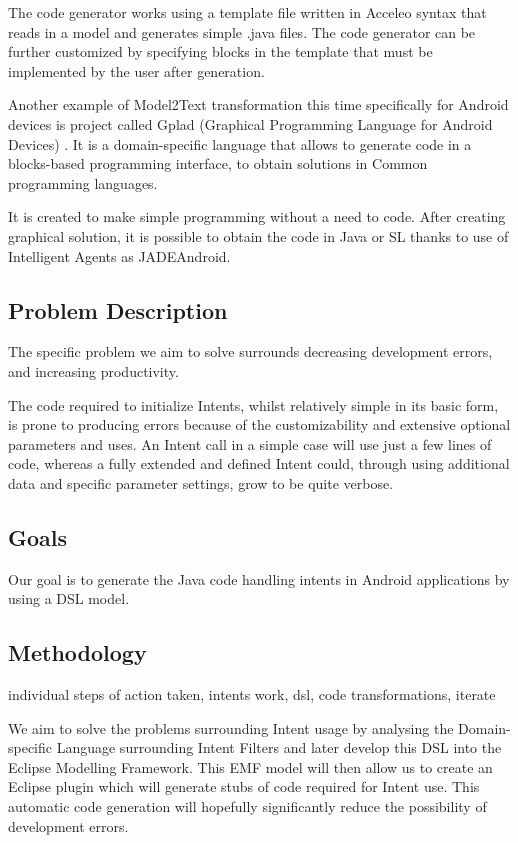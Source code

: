 The code generator works using a template file written in Acceleo syntax that reads in a model and generates simple .java files. The code generator can be further customized by specifying blocks in the template that must be implemented by the user after generation.

Another example of Model2Text transformation this time specifically for Android devices is project called Gplad (Graphical Programming Language for Android Devices) \cite{gplad}. It is a domain-specific language that allows to generate code in a blocks-based programming interface, to obtain solutions in Common programming languages.

It is created to make simple programming without a need to code. After creating graphical solution, it is possible to obtain the code in Java or SL thanks to use of Intelligent Agents as JADEAndroid.

\subsection{Problem Description} 
The specific problem we aim to solve surrounds decreasing development errors, and increasing productivity.

The code required to initialize Intents, whilst relatively simple in its basic form, is prone to producing errors because of the customizability and extensive optional parameters and uses. An Intent call in a simple case will use just a few lines of code, whereas a fully extended and defined Intent could, through using additional data and specific parameter settings, grow to be quite verbose.

\subsection{Goals}
Our goal is to generate the Java code handling intents in Android applications by using a DSL model. 

\subsection{Methodology}
individual steps of action taken, intents work, dsl, code transformations, iterate

We aim to solve the problems surrounding Intent usage by analysing the Domain-specific Language surrounding Intent Filters and later develop this DSL into the Eclipse Modelling Framework. This EMF model will then allow us to create an Eclipse plugin which will generate stubs of code required for Intent use. This automatic code generation will hopefully significantly reduce the possibility of development errors.


